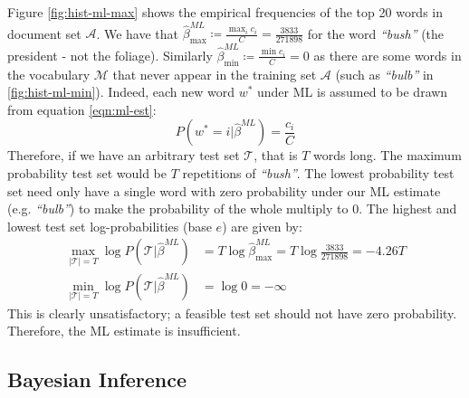 \documentclass[]{article}
\newcommand{\Acal}{\mathcal{A}}
\newcommand{\Mcal}{\mathcal{M}}
\newcommand{\betaml}{\hat{\beta}^{ML}}
\begin{document}
Figure \ref{fig:hist-ml-max} shows the empirical frequencies of the top 20 words in document set $\Acal$. We have that $\betaml_{\max} \coloneqq \frac{\max_i c_i}{C} = \frac{3833}{271898}$ for the word \textit{``bush''} (the president - not the foliage). Similarly $\betaml_{\min} \coloneqq \frac{\min c_i}{C} = 0$ as there are some words in the vocabulary $\Mcal$ that never appear in the training set $\Acal$ (such as \textit{``bulb''} in \ref{fig:hist-ml-min}). Indeed, each new word $w^*$ under ML is assumed to be drawn from equation \ref{eqn:ml-est}:
%
\begin{equation}
	P(w^* = i | \betaml) = \frac{c_i}{C}
	\label{eqn:ml-est}
\end{equation}
%
Therefore, if we have an arbitrary test set $\mathcal{T}$, that is $T$ words long. The maximum probability test set would be $T$ repetitions of \textit{``bush''}. The lowest probability test set need only have a single word with zero probability under our ML estimate (e.g. \textit{``bulb''}) to make the probability of the whole multiply to 0. The highest and lowest test set log-probabilities (base $e$) are given by:
%
\begin{align}
	\max_{|\mathcal{T}| = T} \log P(\mathcal{T} | \betaml) &= T \log \betaml_{\max} = T \log \frac{3833}{271898} = -4.26T \\
	\min_{|\mathcal{T}| = T} \log P(\mathcal{T} | \betaml) &= \log 0 = - \infty
\end{align}
%
This is clearly unsatisfactory; a feasible test set should not have zero probability. Therefore, the ML estimate is insufficient.
 
 \clearpage
\subsection{Bayesian Inference}
\end{document}
